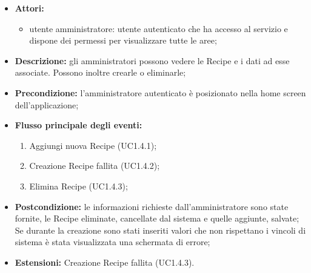 \begin{itemize}
	\item \textbf{Attori:}
	\begin{itemize}
		\item utente amministratore: utente autenticato che ha accesso al servizio e dispone dei permessi per visualizzare tutte le aree;
	\end{itemize}
	\item \textbf{Descrizione:} gli amministratori possono vedere le Recipe e i dati ad esse associate. Possono inoltre crearle o eliminarle;
	\item \textbf{Precondizione:} l'amministratore autenticato è posizionato nella home screen dell'applicazione;
	\item \textbf{Flusso principale degli eventi:}
	\begin{enumerate}
		\item Aggiungi nuova Recipe (UC1.4.1);
		\item Creazione Recipe fallita (UC1.4.2);
		\item Elimina Recipe (UC1.4.3);
	\end{enumerate}
	\item \textbf{Postcondizione:} le informazioni richieste dall'amministratore sono state fornite, le Recipe eliminate, cancellate dal sistema e quelle aggiunte, salvate; Se durante la creazione sono stati inseriti valori che non rispettano i vincoli di sistema è stata visualizzata una schermata di errore;
	\item \textbf{Estensioni:} Creazione Recipe fallita (UC1.4.3).
\end{itemize}

